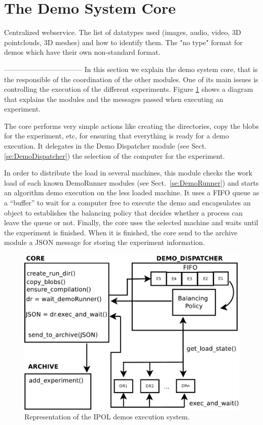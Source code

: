 \section{The Demo System Core}
Centralized webservice.
The list of datatypes used (images, audio, video, 3D pointclouds, 3D meshes) and how to identify them. The "no type" format for demos which have their own non-standard format.

\newline
---------------------------------
\newline
In this section we explain the demo system core, that is the responsible of the coordination of the other modules. One of its main issues is controlling the execution of the different experiments. Figure \ref{fig:core_diagram} shows a diagram that explains the modules and the messages passed when executing an experiment.

The core performs very simple actions like creating the directories, copy the blobs for the experiment, etc, for ensuring that everything is ready for a demo execution. It delegates in the Demo Dispatcher module (see Sect.\ref{se:DemoDispatcher}) the selection of the computer for the experiment. 

In order to distribute the load in several machines, this module checks the work load of each known DemoRunner modules (see Sect.~\ref{se:DemoRunner}) and starts an algorithm demo execution on the less loaded machine. It uses a FIFO queue as a ``buffer'' to wait for a computer free to execute the demo and encapsulates an object to establishes the balancing policy that decides whether a process can leave the queue or not. Finally, the core uses the selected machine and waits until the experiment is finished. When it is finished, the core send to the archive module a JSON message for storing the experiment information.


\begin{figure}[!ht]
\centering
\includegraphics[width=0.7\columnwidth]{core/images/core_diagram.pdf}
\caption{Representation of the IPOL demos execution system.} 
\label{fig:core_diagram}
\end{figure}


